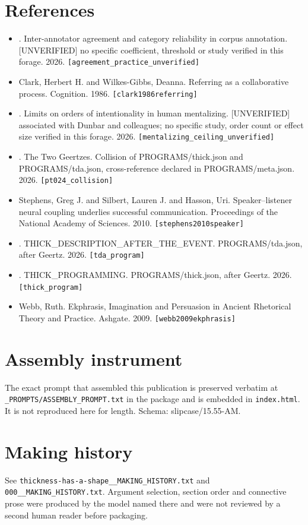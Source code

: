 \documentclass[11pt,a4paper]{article}
\begin{document}
\section*{References}\small
\begin{itemize}\setlength\itemsep{0pt}
\item [author unrecorded]. Inter-annotator agreement and category reliability in corpus annotation. [UNVERIFIED] no specific coefficient, threshold or study verified in this forage. 2026. \texttt{[agreement\_practice\_unverified]}
\item Clark, Herbert H. and Wilkes-Gibbs, Deanna. Referring as a collaborative process. Cognition. 1986. \texttt{[clark1986referring]}
\item [author unrecorded]. Limits on orders of intentionality in human mentalizing. [UNVERIFIED] associated with Dunbar and colleagues; no specific study, order count or effect size verified in this forage. 2026. \texttt{[mentalizing\_ceiling\_unverified]}
\item [author unrecorded]. The Two Geertzes. Collision of PROGRAMS/thick.json and PROGRAMS/tda.json, cross-reference declared in PROGRAMS/meta.json. 2026. \texttt{[pt024\_collision]}
\item Stephens, Greg J. and Silbert, Lauren J. and Hasson, Uri. Speaker--listener neural coupling underlies successful communication. Proceedings of the National Academy of Sciences. 2010. \texttt{[stephens2010speaker]}
\item [author unrecorded]. THICK\_DESCRIPTION\_AFTER\_THE\_EVENT. PROGRAMS/tda.json, after Geertz. 2026. \texttt{[tda\_program]}
\item [author unrecorded]. THICK\_PROGRAMMING. PROGRAMS/thick.json, after Geertz. 2026. \texttt{[thick\_program]}
\item Webb, Ruth. Ekphrasis, Imagination and Persuasion in Ancient Rhetorical Theory and Practice. Ashgate. 2009. \texttt{[webb2009ekphrasis]}
\end{itemize}\normalsize
\appendix
\section{Assembly instrument}
The exact prompt that assembled this publication is preserved verbatim at
\texttt{\_PROMPTS/ASSEMBLY\_PROMPT.txt} in the package and is embedded in \texttt{index.html}.
It is not reproduced here for length. Schema: slipcase/15.55-AM.
\section{Making history}
See \texttt{thickness-has-a-shape\_\_MAKING\_HISTORY.txt} and \texttt{000\_\_MAKING\_HISTORY.txt}.
Argument selection, section order and connective prose were produced by the model named there
and were not reviewed by a second human reader before packaging.
\end{document}
